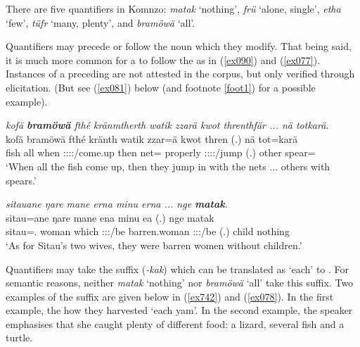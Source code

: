 There are five quantifiers in Komnzo: \emph{matak} `nothing', \emph{frü} `alone, single', \emph{etha} `few', \emph{tüfr} `many, plenty', and \emph{bramöwä} `all'.%

Quantifiers may precede or follow the noun which they modify. That being said, it is much more common for a  to follow the  as in (\ref{ex090}) and (\ref{ex077}). Instances of a preceding  are not attested in the corpus, but only verified through elicitation. (But see (\ref{ex081}) below (and footnote \ref{foot1}) for a possible example).

\begin{exe}
	\ex \emph{kofä \textbf{bramöwä} fthé kränmtherth watik zzarä kwot threnthfär ... nä totkarä.}\\
	\gll kofä bramöwä fthé kränth watik zzar=ä kwot thren (.) nä tot=karä\\
	fish all when \Stpl:\Sbj:\Irr:\Pfv:\Venit/come.up then net=\Assoc{} properly \Stpl:\Sbj:\Irr:\Pfv:\Venit{}/jump (.) other spear=\Prop{}\\
	\trans `When all the fish come up, then they jump in with the nets ... others with spears.'
	\label{ex090}
\end{exe}
\begin{exe}
	\ex \emph{sitauane ŋare mane erna minu erna ... nge \textbf{matak}.}\\
	\gll sitau=ane ŋare mane ena {minu} ea (.) nge matak\\
	sitau=\Poss.\Sg{} woman which \Stdu:\Sbj:\Pst:\Ipfv{}/be {barren.woman} \Stdu:\Sbj:\Pst:\Ipfv/be (.) child nothing\\
	\trans `As for Sitau's two wives, they were barren women without children.'\\
	\label{ex077}
\end{exe}

Quantifiers may take the  suffix (\emph{-kak}) which can be translated as `each' to . For semantic reasons, neither \emph{matak} `nothing' nor \emph{bramöwä} `all' take this suffix. Two examples of the  suffix are given below in (\ref{ex742}) and (\ref{ex078}). In the first example, the how they harvested `each yam'. In the second example, the speaker emphasises that she caught plenty of different food: a lizard, several fish and a turtle.

